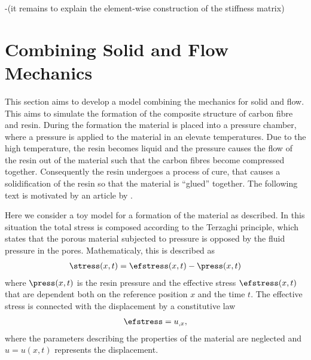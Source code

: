 \documentclass[twoside,a4paper,12pt]{article}
\newcommand{\note}[1]{{\color{red}(#1)}}
\begin{document}
-\note{it remains to explain the element-wise construction of the stiffness matrix}

\section{Combining Solid and Flow Mechanics}

This section aims to develop a model combining the mechanics for solid
and flow. This aims to simulate the formation of the composite
structure of carbon fibre and resin. During the formation the material
is placed into a pressure chamber, where a pressure is applied to the
material in an elevate temperatures. Due to the high temperature, the
resin becomes liquid and the pressure causes the flow of the resin out
of the material such that the carbon fibres become compressed
together. Consequently the resin undergoes a process of cure, that
causes a solidification of the resin so that the material is ``glued''
together. The following text is motivated by an article by
\citet{Hubert1999}.

Here we consider a toy model for a formation of the material as
described.  In this situation the total stress is composed according
to the Terzaghi principle, which states that the porous material
subjected to pressure is opposed by the fluid pressure in the
pores. Mathematicaly, this is described as
%
\begin{align}
\stress(x,t) = \efstress(x,t) - \press(x,t) \label{eq:flow-stress}
\end{align}
%
where $\press(x,t)$ is the resin pressure and the effective stress
$\efstress(x,t)$ that are dependent both on the reference position $x$ and
the time $t$. The effective stress is connected with the
displacement by a constitutive law
\begin{align}
\efstress = u_{,x},
\end{align}
%
where the parameters describing the properties of the material are
neglected and $u= u(x,t)$ represents the displacement.
\end{document}
